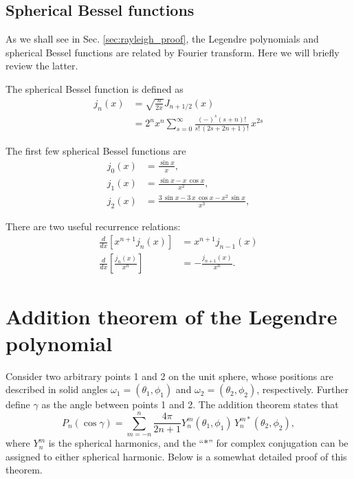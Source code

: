 \documentclass[11pt]{article}
\begin{document}
\subsection{Spherical Bessel functions}



As we shall see in Sec. \ref{sec:rayleigh_proof},
the Legendre polynomials
and spherical Bessel functions
are related by Fourier transform.
%
Here we will briefly review the latter.

The spherical Bessel function is defined as
\begin{align}
j_n(x)
&= \sqrt{ \frac{ n } { 2 x } } J_{n + 1/2}(x) \\
&= 2^n x^n
\sum_{s = 0}^\infty
\frac { (-)^s (s + n)! }
{ s! \, (2 s + 2 n + 1)! }
\,
x^{2s}
\label{eq:besselj}
\end{align}

The first few spherical Bessel functions are
\begin{align*}
  j_0(x) &= \frac { \sin x } { x }, \\
  j_1(x) &= \frac { \sin x - x \, \cos x } { x^2 }, \\
  j_2(x) &= \frac { 3 \, \sin x - 3 \, x \, \cos x - x^2 \, \sin x } { x^3 },
\end{align*}

There are two useful recurrence relations:
\begin{align}
  \frac{d}{dx}
  \left[
    x^{n+1} j_n(x)
  \right]
&=
  x^{n+1} j_{n - 1}(x)
\label{eq:recur_jn1}
  \\
  \frac{d}{dx}
  \left[
    \frac{ j_n(x) }{ x^n }
  \right]
&=
  - \frac{ j_{n+1}(x) }{ x^n }.
\label{eq:recur_jn2}
\end{align}



\section{Addition theorem of the Legendre polynomial}



Consider two arbitrary points 1 and 2 on the unit sphere,
whose positions are described in solid angles
$\omega_1 = (\theta_1, \phi_1)$
and
$\omega_2 = (\theta_2, \phi_2)$, respectively.
%
Further define $\gamma$ as the angle between points 1 and 2.
%
The addition theorem states that
\begin{equation}
  P_n(\cos\gamma)
= \sum_{m = -n}^n \frac{ 4 \pi } { 2 n + 1 }
  Y_n^m(\theta_1, \phi_1) \, Y_n^{m*}(\theta_2, \phi_2),
\label{eq:addition}
\end{equation}
where $Y_n^m$ is the spherical harmonics,
and the ``$*$'' for complex conjugation
can be assigned to either spherical harmonic.
Below is a somewhat detailed proof of this theorem.
\end{document}

